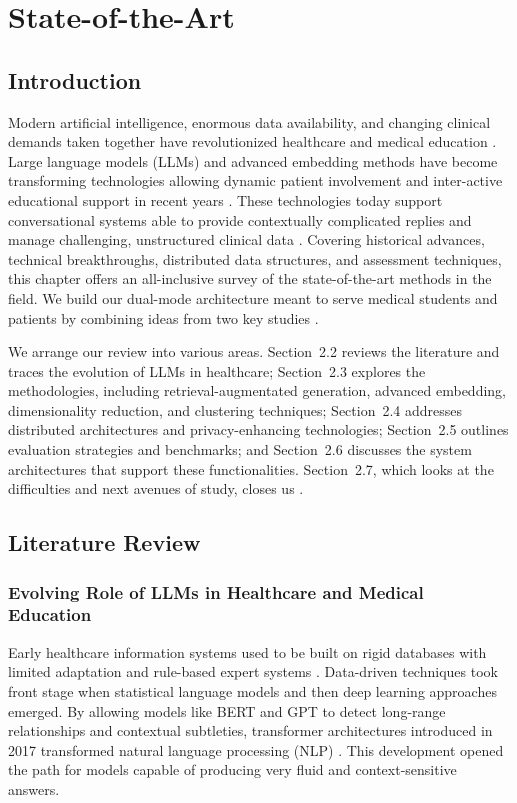 \chapter{State-of-the-Art}

\section{Introduction}
Modern artificial intelligence, enormous data availability, and changing clinical demands taken together have revolutionized healthcare and medical education \cite{topol2019}. Large language models (LLMs) and advanced embedding methods have become transforming technologies allowing dynamic patient involvement and inter-active educational support in recent years \cite{dineen2019}. These technologies today support conversational systems able to provide contextually complicated replies and manage challenging, unstructured clinical data \cite{editorial2023}. Covering historical advances, technical breakthroughs, distributed data structures, and assessment techniques, this chapter offers an all-inclusive survey of the state-of-the-art methods in the field. We build our dual-mode architecture meant to serve medical students and patients by combining ideas from two key studies \cite{montagna2023}.

We arrange our review into various areas. Section~2.2 reviews the literature and traces the evolution of LLMs in healthcare; Section~2.3 explores the methodologies, including retrieval-augmentated generation, advanced embedding, dimensionality reduction, and clustering techniques; Section~2.4 addresses distributed architectures and privacy-enhancing technologies; Section~2.5 outlines evaluation strategies and benchmarks; and Section~2.6 discusses the system architectures that support these functionalities. Section~2.7, which looks at the difficulties and next avenues of study, closes us \cite{montagna2023}.

\section{Literature Review}

\subsection{Evolving Role of LLMs in Healthcare and Medical Education}
Early healthcare information systems used to be built on rigid databases with limited adaptation and rule-based expert systems \cite{clark1991}. Data-driven techniques took front stage when statistical language models and then deep learning approaches emerged. By allowing models like BERT and GPT to detect long-range relationships and contextual subtleties, transformer architectures introduced in 2017 transformed natural language processing (NLP) \cite{gpt4tech}. This development opened the path for models capable of producing very fluid and context-sensitive answers.

